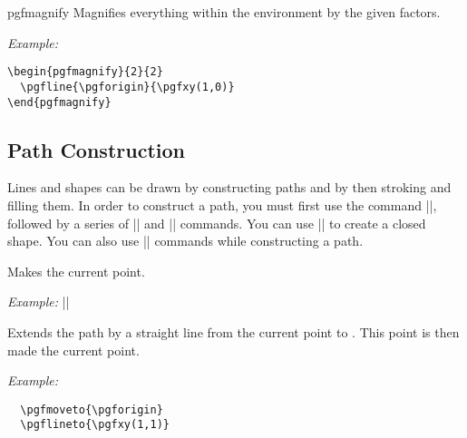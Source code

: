 \documentclass{ltxdoc}
\def\example{\par\smallskip\noindent\textit{Example: }}
\begin{document}
\begin{environment}{{pgfmagnify}}
  Magnifies everything within the environment by the given
  factors.
  \example
\begin{verbatim}
\begin{pgfmagnify}{2}{2}
  \pgfline{\pgforigin}{\pgfxy(1,0)}
\end{pgfmagnify}
\end{verbatim}
\end{environment}




\subsection{Path Construction}

Lines and shapes can be drawn by constructing paths and by then
stroking and filling them. In order to construct a path, you must
first use the command |\pgfmoveto|, followed by a series of
|\pgflineto| and |\pgfcurveto| commands. You can use
|\pgfclosepath| to create a closed shape. You can also use
|\pgfmoveto| commands while constructing a path.


\begin{command}{\pgfmoveto{}}
  Makes  the current point.
  \example |\pgfmoveto{\pgforigin}|
\end{command}


\begin{command}{\pgflineto{}}
  Extends the path by a straight line from the current point to
  . This point is then made the current point.
  \example
\begin{verbatim}
  \pgfmoveto{\pgforigin}
  \pgflineto{\pgfxy(1,1)}
\end{verbatim}
\end{command}
\end{document}
